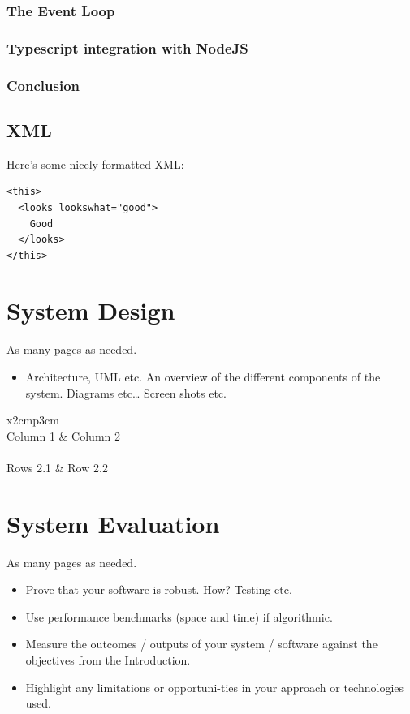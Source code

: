     
    	

\subsection{The Event Loop}

\subsection{Typescript integration with NodeJS}

\subsection{Conclusion}





	




\section{XML}
Here's some nicely formatted XML:
\begin{verbatim}
<this>
  <looks lookswhat="good">
    Good
  </looks>
</this>
\end{verbatim}

\chapter{System Design}
As many pages as needed.
\begin{itemize}
\item Architecture, UML etc. An overview of the different components of the system. Diagrams etc… Screen shots etc.
\end{itemize}

\begin{table}[h]
  \centering
  \begin{tabular}{x{2cm}p{3cm}}
    \toprule \\
    Column 1 & Column 2 \\
    \midrule \\
    Rows 2.1 & Row 2.2 \\
    \bottomrule
  \end{tabular}
  \caption{A table.}
  \label{table:mytable}
\end{table}

\chapter{System Evaluation}
As many pages as needed.
\begin{itemize}
\item Prove that your software is robust. How? Testing etc. 
\item Use performance benchmarks (space and time) if algorithmic.
\item Measure the outcomes / outputs of your system / software against the objectives from the Introduction.
\item Highlight any limitations or opportuni-ties in your approach or technologies used.
\end{itemize}

